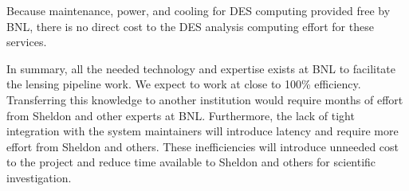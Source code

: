 \documentclass[12pt]{article}
\begin{document}
Because maintenance, power, and cooling for DES computing provided free by BNL,
there is no direct cost to the DES analysis computing effort for these services.

In summary, all the needed technology and expertise exists at BNL to facilitate
the lensing pipeline work.  We expect to work at close to 100\% efficiency.
Transferring this knowledge to another institution would require months of
effort from Sheldon and other experts at BNL.  Furthermore, the lack of tight
integration with the system maintainers will introduce latency and require more
effort from Sheldon and others.  These inefficiencies will introduce unneeded
cost to the project and reduce time available to Sheldon and others for
scientific investigation.
\end{document}
